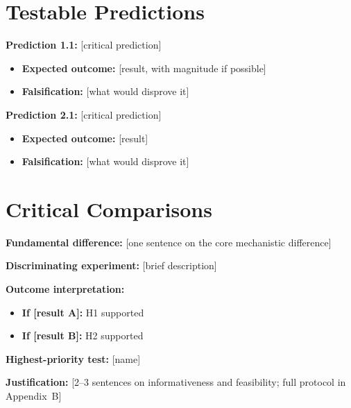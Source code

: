 \documentclass[11pt,letterpaper]{article}
\begin{document}
\section{Testable Predictions}
\begin{predictionbox}
\textbf{Prediction 1.1:} [critical prediction]
\begin{itemize}\item \textbf{Expected outcome:} [result, with magnitude if possible]\item \textbf{Falsification:} [what would disprove it]\end{itemize}
\end{predictionbox}
\vspace{0.3cm}
\begin{predictionbox}
\textbf{Prediction 2.1:} [critical prediction]
\begin{itemize}\item \textbf{Expected outcome:} [result]\item \textbf{Falsification:} [what would disprove it]\end{itemize}
\end{predictionbox}

\section{Critical Comparisons}
\begin{comparisonbox}
\textbf{Fundamental difference:} [one sentence on the core mechanistic difference]\par\vspace{0.2cm}
\textbf{Discriminating experiment:} [brief description]\par\vspace{0.2cm}
\textbf{Outcome interpretation:}
\begin{itemize}\item \textbf{If [result A]:} H1 supported\item \textbf{If [result B]:} H2 supported\end{itemize}
\end{comparisonbox}
\vspace{0.3cm}
\textbf{Highest-priority test:} [name]\par
\textbf{Justification:} [2--3 sentences on informativeness and feasibility; full protocol in Appendix~B]
\end{document}
